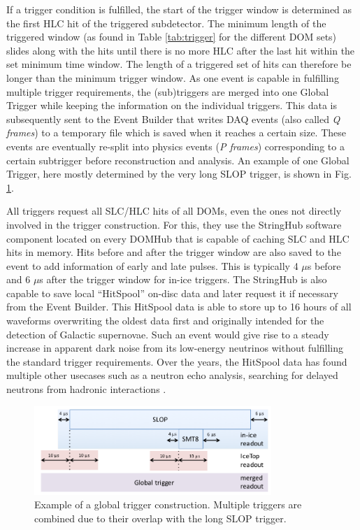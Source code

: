 If a trigger condition is fulfilled, the start of the trigger window is determined as the first HLC hit of the triggered subdetector. The minimum length of the triggered window (as found in Table \ref{tab:trigger} for the different DOM sets) slides along with the hits until there is no more HLC after the last hit within the set minimum time window. The length of a triggered set of hits can therefore be longer than the minimum trigger window. As one event is capable in fulfilling multiple trigger requirements, the (sub)triggers are merged into one Global Trigger while keeping the information on the individual triggers. This data is subsequently sent to the Event Builder that writes DAQ events (also called \textit{Q frames}) to a temporary file which is saved when it reaches a certain size. These events are eventually re-split into physics events (\textit{P frames}) corresponding to a certain subtrigger before reconstruction and analysis. An example of one Global Trigger, here mostly determined by the very long SLOP trigger, is shown in Fig. \ref{fig:globaltrigger}.

All triggers request all SLC/HLC hits of all DOMs, even the ones not directly involved in the trigger construction. For this, they use the StringHub software component located on every DOMHub that is capable of caching SLC and HLC hits in memory. Hits before and after the trigger window are also saved to the event to add information of early and late pulses. This is typically 4 $\mu$s before and 6 $\mu$s after the trigger window for in-ice triggers. The StringHub is also capable to save local ``HitSpool'' on-disc data and later request it if necessary from the Event Builder. This HitSpool data is able to store up to 16 hours of all waveforms overwriting the oldest data first and originally intended for the detection of Galactic supernovae. Such an event would give rise to a steady increase in apparent dark noise from its low-energy neutrinos without fulfilling the standard trigger requirements. Over the years, the HitSpool data has found multiple other usecases such as a neutron echo analysis, searching for delayed neutrons from hadronic interactions \cite{Aartsen:2017mnf}. 

\begin{figure}[t]
\centering
\includegraphics[width=0.8\textwidth]{chapter5/img/globaltrigger.png}
\caption{Example of a global trigger construction. Multiple triggers are combined due to their overlap with the long SLOP trigger.}
\label{fig:globaltrigger}
\end{figure}


